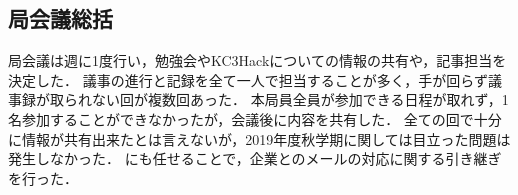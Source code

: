 \subsection*{局会議総括}


局会議は週に1度行い，勉強会やKC3Hackについての情報の共有や，記事担当を決定した．
議事の進行と記録を全て一人で担当することが多く，手が回らず議事録が取られない回が複数回あった．
本局員全員が参加できる日程が取れず，1名参加することができなかったが，会議後に内容を共有した．
全ての回で十分に情報が共有出来たとは言えないが，2019年度秋学期に関しては目立った問題は発生しなかった．
\firstGrade{}にも任せることで，企業とのメールの対応に関する引き継ぎを行った．
